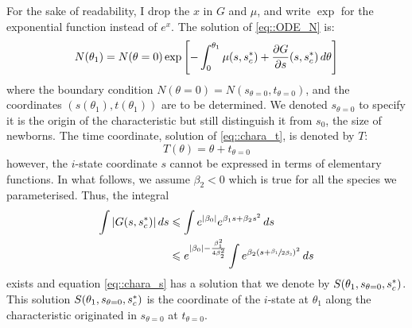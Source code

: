 \begin{refsection}
For the sake of readability, I drop the $ x $ in $ G $ and $ \mu $, and write $ \exp $ for the exponential function instead of $ e^x $. The solution of \eqref{eq::ODE_N} is:
\begin{equation} \label{eq::sol_ODE_N}
	N(\theta_1) = N(\theta = 0) \exp \left[-\int_0^{\theta_1} \mu(s, {s}^{*}_c) + \frac{\partial G}{\partial s}(s, {s}^{*}_c) \, d\theta \right]
\end{equation}
where the boundary condition $ N(\theta = 0) = N(s_{\theta = 0}, t_{\theta = 0}) $, and the coordinates $ (s(\theta_1), t(\theta_1)) $ are to be determined. We denoted $ s_{\theta = 0} $ to specify it is the origin of the characteristic but still distinguish it from $ s_0 $, the size of newborns. The time coordinate, solution of \eqref{eq::chara_t}, is denoted by $ T $:
\[
	T(\theta) = \theta + t_{\theta = 0}
\]
however, the $ i $-state coordinate $ s $ cannot be expressed in terms of elementary functions. In what follows, we assume $ \beta_2 < 0 $ which is true for all the species we parameterised. Thus, the integral
\begin{align*}
	\int  | G(s, {s}^{*}_c) | \, ds &\leqslant \int e^{|\beta_0|} e^{\beta_1 s + \beta_2 s^2} \, ds \\
	&\leqslant e^{|\beta_0| - \frac{\beta_1^2}{4 \beta_2^2}} \int e^{\beta_2(s + \sfrac{\beta_1}{2\beta_2})^2} \, ds
\end{align*}
exists and equation \eqref{eq::chara_s} has a solution that we denote by $ S(\theta_1, s_{\theta = 0}, {s}^{*}_c) $. This solution $ S(\theta_1, s_{\theta = 0}, {s}^{*}_c) $ is the coordinate of the $ i $-state at $ \theta_1 $ along the characteristic originated in $ s_{\theta = 0} $ at $ t_{\theta = 0} $.


\end{refsection}
